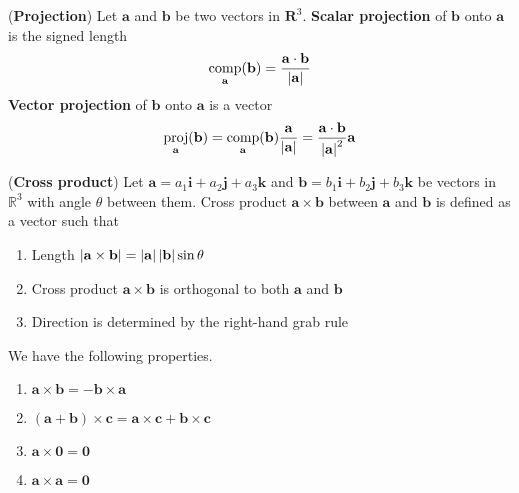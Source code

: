 \documentclass{huhtakm-template-book}
\DeclareMathOperator{\proj}{proj}
\DeclareMathOperator{\comp}{comp}
\begin{document}
\newpage
\begin{defn}(\textbf{Projection})
    Let $\mathbf{a}$ and $\mathbf{b}$ be two vectors in $\mathbf{R}^{3}$. \textbf{Scalar projection} of $\mathbf{b}$ onto $\mathbf{a}$ is the signed length
    \begin{equation*}
        \comp_{\mathbf{a}}(\mathbf{b})=\frac{\mathbf{a}\cdot\mathbf{b}}{\abs{\mathbf{a}}}
    \end{equation*}
    \textbf{Vector projection} of $\mathbf{b}$ onto $\mathbf{a}$ is a vector
    \begin{equation*}
        \proj_{\mathbf{a}}(\mathbf{b})=\comp_{\mathbf{a}}(\mathbf{b})\frac{\mathbf{a}}{\abs{\mathbf{a}}}=\frac{\mathbf{a}\cdot\mathbf{b}}{\abs{\mathbf{a}}^{2}}\mathbf{a}
    \end{equation*}
\end{defn}
\begin{defn}(\textbf{Cross product})
    Let $\mathbf{a}=a_{1}\mathbf{i}+a_{2}\mathbf{j}+a_{3}\mathbf{k}$ and $\mathbf{b}=b_{1}\mathbf{i}+b_{2}\mathbf{j}+b_{3}\mathbf{k}$ be vectors in $\mathbb{R}^{3}$ with angle $\theta$ between them. Cross product $\mathbf{a}\times\mathbf{b}$ between $\mathbf{a}$ and $\mathbf{b}$ is defined as a vector such that
    \begin{enumerate}
        \item Length $\left|{\mathbf{a}\times\mathbf{b}}\right|=\left|{\mathbf{a}}\right|\left|{\mathbf{b}}\right|\sin\theta$
        \item Cross product $\mathbf{a}\times\mathbf{b}$ is orthogonal to both $\mathbf{a}$ and $\mathbf{b}$
        \item Direction is determined by the right-hand grab rule
    \end{enumerate}
\end{defn}
\begin{lem}
    We have the following properties.
    \begin{enumerate}
        \item $\mathbf{a}\times\mathbf{b}=-\mathbf{b}\times\mathbf{a}$
        \item $(\mathbf{a}+\mathbf{b})\times\mathbf{c}=\mathbf{a}\times\mathbf{c}+\mathbf{b}\times\mathbf{c}$
        \item $\mathbf{a}\times\mathbf{0}=\mathbf{0}$
        \item $\mathbf{a}\times\mathbf{a}=\mathbf{0}$
    \end{enumerate}
\end{lem}
\end{document}
